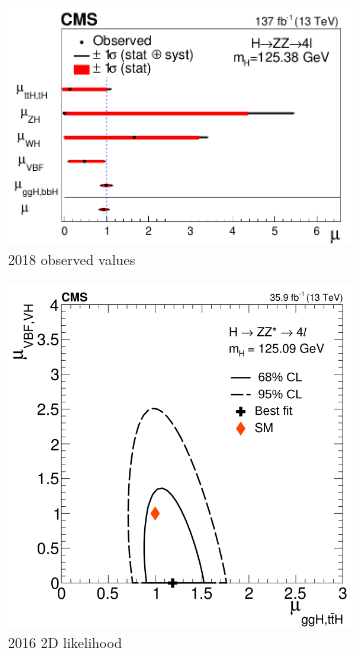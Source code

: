 \begin{figure}[h]
\begin{subfigure}[b]{0.3\textwidth}
         \includegraphics[width=\textwidth]{images/ssm2018.png}
         \caption{2018 observed values}
         \end{subfigure}
          \hfill
         \begin{subfigure}[b]{0.3\textwidth}
         \includegraphics[width=\textwidth]{images/ssm2016b.png}
         \caption{2016 2D likelihood}
     \end{subfigure}
     \hfill
     \begin{subfigure}[b]{0.3\textwidth}

\end{subfigure}
\end{figure}
